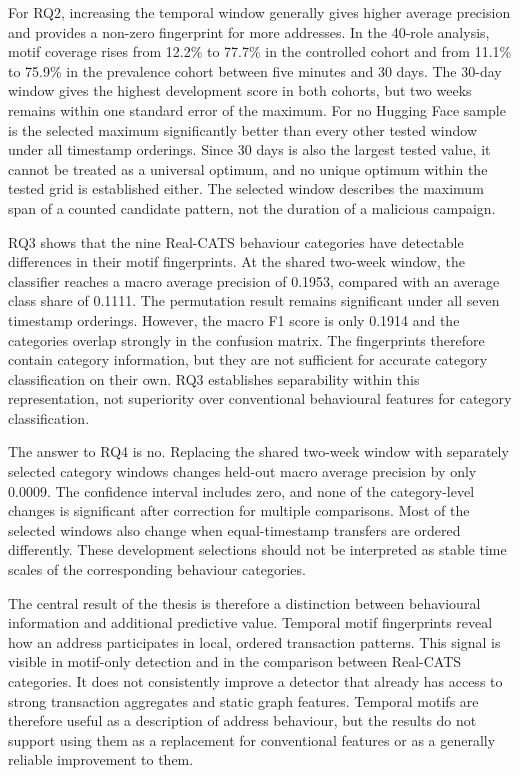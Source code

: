 \documentclass{thesisclass}
\begin{document}
For RQ2, increasing the temporal window generally gives higher average precision
and provides a non-zero
fingerprint for more addresses. In the 40-role analysis, motif
coverage rises from 12.2\% to 77.7\% in the controlled cohort and from
11.1\% to 75.9\% in the prevalence cohort between five minutes and 30 days.
The 30-day window gives
the highest development score in both cohorts, but two weeks remains within one
standard error of the maximum. For no Hugging Face sample is the selected maximum
significantly better than every other tested window under all timestamp
orderings. Since 30
days is also the largest tested value, it cannot be treated as a universal
optimum, and no unique optimum within the tested grid is established either.
The selected window describes the maximum span of a counted candidate pattern,
not the duration of a malicious
campaign.

RQ3 shows that the nine Real-CATS behaviour categories have detectable
differences in their motif fingerprints. At the shared two-week window, the
classifier reaches a macro average precision of 0.1953, compared with an
average class share of 0.1111. The permutation result remains significant under
all seven timestamp orderings. However, the macro F1 score is only 0.1914 and
the categories overlap strongly in the confusion matrix. The fingerprints
therefore contain category information, but they are not sufficient for
accurate category classification on their own. RQ3 establishes separability
within this representation, not superiority over conventional behavioural
features for category classification.

The answer to RQ4 is no. Replacing the shared two-week window with separately
selected category windows changes held-out macro average precision by only
0.0009. The confidence interval includes zero, and none of the category-level
changes is significant after correction for multiple comparisons. Most of the
selected windows also change when equal-timestamp transfers are ordered
differently. These development selections should not be interpreted as stable
time scales of the corresponding behaviour categories.

The central result of the thesis is therefore a distinction between behavioural
information and additional predictive value. Temporal motif fingerprints reveal
how an address participates in local, ordered transaction patterns. This signal
is visible in motif-only detection and in the comparison between Real-CATS
categories. It does not consistently improve a detector that already has access
to strong transaction aggregates and static graph features. Temporal motifs are
therefore useful as a description of address behaviour, but the results do not
support using them as a replacement for conventional features or as a generally
reliable improvement to them.
\end{document}
